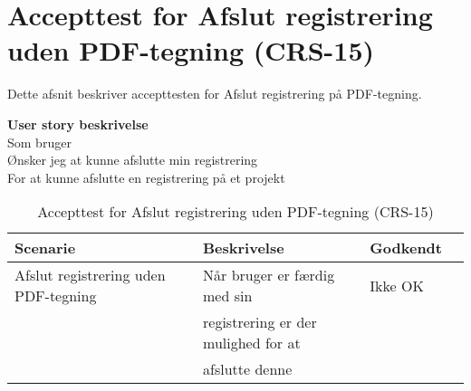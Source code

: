 \section{Accepttest for Afslut registrering uden PDF-tegning (CRS-15)}
Dette afsnit beskriver accepttesten for Afslut registrering på PDF-tegning.

\textbf{User story beskrivelse} \\
Som bruger \\
Ønsker jeg at kunne afslutte min registrering \\
For at kunne afslutte en registrering på et projekt

\begin{table}[H]
	\centering
	\begin{tabular}{|ll|l|ll|} \hline
		\textbf{Scenarie} &  & \textbf{Beskrivelse}&  \textbf{Godkendt}&  \\ \hline
		Afslut registrering uden PDF-tegning&  &  Når bruger er færdig med sin &  Ikke OK&  \\
		& & registrering er der mulighed for at& & \\
		& & afslutte denne& & \\ \hline
	\end{tabular}
	\caption{Accepttest for Afslut registrering uden PDF-tegning (CRS-15)}
	\label{AcceptAfslutUdenPDF}
\end{table}
